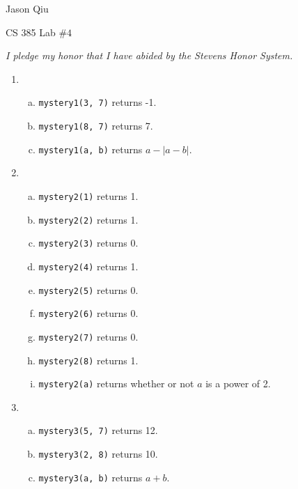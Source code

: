 \documentclass[a4paper,10pt]{article}
\begin{document}
Jason Qiu

CS 385 Lab $\#4$

\emph{I pledge my honor that I have abided by the Stevens Honor System.}

\begin{enumerate}[1.]
\item \begin{enumerate}[(a)]
	\item \verb|mystery1(3, 7)| returns -1.
	\item \verb|mystery1(8, 7)| returns 7.
	\item \verb|mystery1(a, b)| returns $a - |a-b|$.
\end{enumerate}

\item \begin{enumerate}[(a)]
	\item \verb|mystery2(1)| returns 1.
	\item \verb|mystery2(2)| returns 1.
	\item \verb|mystery2(3)| returns 0.
	\item \verb|mystery2(4)| returns 1.
	\item \verb|mystery2(5)| returns 0.
	\item \verb|mystery2(6)| returns 0.
	\item \verb|mystery2(7)| returns 0.
	\item \verb|mystery2(8)| returns 1.
	\item \verb|mystery2(a)| returns whether or not $a$ is a power of 2.
\end{enumerate}

\item \begin{enumerate}[(a)]
	\item \verb|mystery3(5, 7)| returns 12.
	\item \verb|mystery3(2, 8)| returns 10.
	\item \verb|mystery3(a, b)| returns $a+b$.

\end{enumerate}
\end{enumerate}
\end{document}
